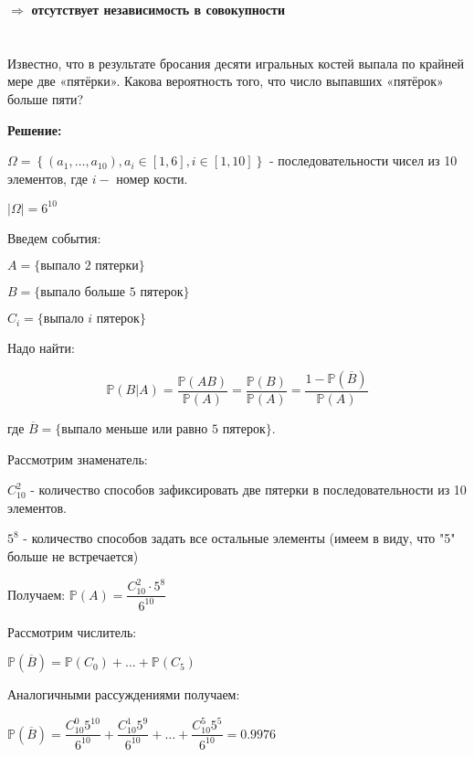 \documentclass[a4paper,12pt]{article}
\newcommand{\lt}{\left}
\newcommand{\rt}{\right}
\newcommand{\ol}{\overline}
\newcommand{\bb}{\mathbb}
\begin{document}
$\Rightarrow $ \textbf{отсутствует независимость в совокупности}


\section{}

Известно, что в результате бросания десяти игральных костей выпала по крайней мере две «пятёрки». Какова вероятность того, что число выпавших «пятёрок» больше пяти?

\vspace{\baselineskip}

\textbf{Решение:}

\vspace{\baselineskip}

$\Omega = \lt\{(a_1,\dots,a_10), a_i \in [1,6], i \in [1,10]\rt\}$ - последовательности чисел из 10 элементов, где $i - $ номер кости.

$|\Omega| = 6^{10}$ 

Введем события:

$A = \{\text{выпало 2 пятерки}\}$

$B = \{\text{выпало больше 5 пятерок}\}$

$C_i = \{\text{выпало } i \text{ пятерок}\}$

Надо найти:

$$\bb P(B|A) = \dfrac{\bb P(AB)}{\bb P(A)} = \dfrac{\bb P(B)}{\bb P(A)} = \dfrac{1- \bb P(\ol B)}{\bb P(A)}$$

где $\ol B = \{\text{выпало меньше или равно 5 пятерок}\}$.

\vspace{\baselineskip}


Рассмотрим знаменатель:

$C_{10}^2$ - количество способов зафиксировать две пятерки в последовательности из 10 элементов.

$5^8$ - количество способов задать все остальные элементы (имеем в виду, что "5" больше не встречается)

Получаем: $\bb P(A) = \dfrac{C_{10}^2 \cdot5^8}{6^{10}}$

\vspace{\baselineskip}

Рассмотрим числитель:

$\bb P( \ol B) = \bb P(C_0) + \dots +  \bb P(C_5)$

Аналогичными рассуждениями получаем:

$\bb P( \ol B) = \dfrac{C_{10}^0 5^{10}}{6^{10}} + \dfrac{C_{10}^1 5^{9}}{6^{10}}+ \dots + \dfrac{C_{10}^5 5^{5}}{6^{10}} = 0.9976$
\end{document}
